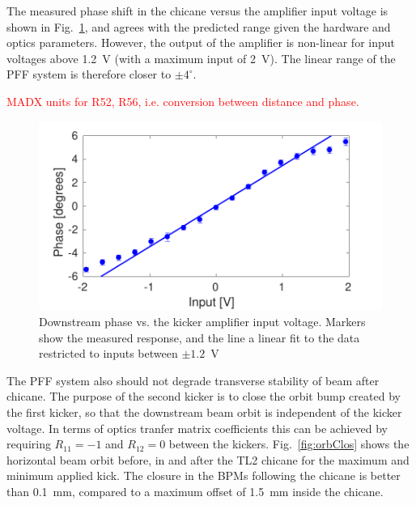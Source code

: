 \documentclass[%
 reprint,
 amsmath,amssymb,
 prl,
]{revtex4-1}
\begin{document}
The measured phase shift in the chicane versus the amplifier input voltage is 
shown in Fig.~\ref{fig:corrRange}, and agrees with the predicted range given 
the hardware and optics parameters. However, the output of the amplifier is 
non-linear for input voltages above 1.2~V (with a maximum input of 2~V). The 
linear range of the PFF system is therefore closer to \(\pm4^\circ\).

\textcolor{red}{MADX units for R52, R56, i.e. conversion between distance and 
phase.}

\begin{figure}
	\includegraphics[width=\columnwidth]{figs/corrRange}
	\caption{\label{fig:corrRange}Downstream phase vs. the kicker amplifier 
	input voltage. Markers show the measured response, and the line a linear 
	fit to the data restricted to inputs between \(\pm1.2\)~V}
\end{figure}

The PFF system also should not degrade transverse stability of beam after 
chicane. The purpose of the second kicker is to close the orbit bump created by 
the first kicker, so that the downstream beam orbit is independent of the 
kicker voltage. In terms of optics tranfer matrix coefficients this can be 
achieved by requiring \(R_{11}=-1\) and \(R_{12}=0\) between the 
kickers. Fig.~\ref{fig:orbClos} shows the horizontal beam orbit before, in and 
after the TL2 chicane for the maximum and minimum applied kick. The closure in 
the BPMs following the chicane is better than 0.1~mm, compared to a maximum 
offset of 1.5~mm inside the chicane.
\end{document}
